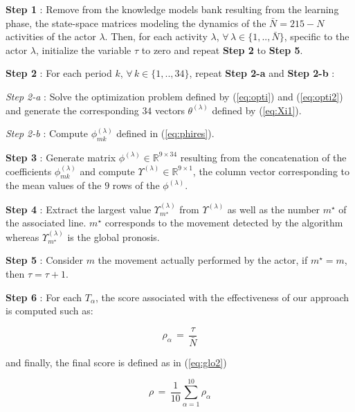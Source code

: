 \documentclass[letterpaper, 10 pt, conference]{ieeeconf}  %
\newcommand{\mR}{{\mathbb R}}
\begin{document}
\begin{description}

\item \textbf{Step 1} : Remove from the knowledge models bank resulting from the learning phase, the state-space matrices modeling the dynamics of the $\bar{N}=215-N$ activities of the actor $\lambda$. Then, for each activity $\lambda$, $\forall \,\lambda \in \{1,..,\bar{N} \}$, specific to the actor $\lambda$, initialize the variable $\tau$ to zero and repeat \textbf{Step 2} to \textbf{Step 5}.\\

\item \textbf{Step 2} : For each period $k$, $\forall \,k \in \{1,..,34 \}$, repeat \textbf{Step 2-a} and \textbf{Step 2-b} :\\

\item \textit{Step 2-a} :  Solve the optimization problem defined by (\ref{eq:opti}) and (\ref{eq:opti2}) and generate the corresponding $34$ vectors $\theta^{(\lambda)}$ defined by (\ref{eq:Xi1}).\\

\item \textit{Step 2-b} : Compute $\phi_{mk}^{(\lambda)}$ defined in (\ref{eq:phires}).\\

\item \textbf{Step 3} : Generate matrix $\phi^{(\lambda)} \in \mR^{9 \times 34}$ resulting from the concatenation of the coefficients $\phi_{mk}^{(\lambda)}$ and compute $\Upsilon^{(\lambda)}\in \mR^{9 \times 1}$, the column vector corresponding to the mean values of the $9$ rows of the $\phi^{(\lambda)}$.\\

\item \textbf{Step 4} : Extract the largest value $\Upsilon_{m^\star}^{(\lambda)}$ from $\Upsilon^{(\lambda)}$ as well as the number $m^\star$ of the associated line. ${m^\star}$ corresponds to the movement detected by the algorithm whereas $\Upsilon_{m^\star}^{(\lambda)}$ is the global pronosis.\\

\item \textbf{Step 5} : Consider $m$ the movement actually performed by the actor, if $m^\star=m$, then $\tau = \tau + 1$.\\

\item \textbf{Step 6} : For each $T_\alpha$, the score associated with the effectiveness of our approach is computed such as:

\begin{equation}
\label{eq:glo}
\rho_\alpha\,=\, \frac{\tau}{\bar{N}}
\end{equation}

and finally, the final score is defined as in (\ref{eq:glo2})

\begin{equation}
\label{eq:glo2}
\rho \,=\, \displaystyle \frac{1}{10}\sum_{\alpha =1}^{10} \rho_\alpha
\end{equation}
\end{description}
\end{document}
